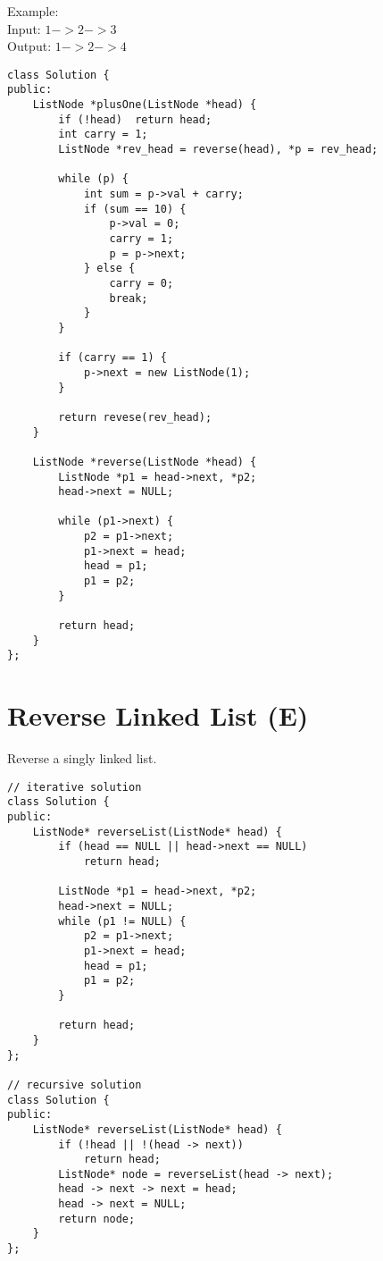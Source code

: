 Example:\\
Input: $1->2->3$\\
Output: $1->2->4$\\

\begin{lstlisting}
class Solution {
public:
    ListNode *plusOne(ListNode *head) {
        if (!head)  return head;
        int carry = 1;
        ListNode *rev_head = reverse(head), *p = rev_head;
        
        while (p) {
            int sum = p->val + carry;
            if (sum == 10) {
                p->val = 0;
                carry = 1;
                p = p->next;
            } else {
                carry = 0;
                break;
            }
        }
        
        if (carry == 1) {
            p->next = new ListNode(1);
        }
        
        return revese(rev_head);
    }
    
    ListNode *reverse(ListNode *head) {
        ListNode *p1 = head->next, *p2;
        head->next = NULL;
        
        while (p1->next) {
            p2 = p1->next;
            p1->next = head;
            head = p1;
            p1 = p2;
        }
        
        return head;
    }
}; 
\end{lstlisting}


\section{Reverse Linked List (E)}
Reverse a singly linked list.\\

\begin{lstlisting}
// iterative solution
class Solution {
public:
    ListNode* reverseList(ListNode* head) {
        if (head == NULL || head->next == NULL)
            return head;
            
        ListNode *p1 = head->next, *p2;
        head->next = NULL;
        while (p1 != NULL) {
            p2 = p1->next;
            p1->next = head;
            head = p1;
            p1 = p2;
        }
        
        return head;
    }
};

// recursive solution
class Solution {
public:   
    ListNode* reverseList(ListNode* head) {
        if (!head || !(head -> next)) 
            return head;
        ListNode* node = reverseList(head -> next);
        head -> next -> next = head;
        head -> next = NULL;
        return node; 
    }
}; 
\end{lstlisting} 


